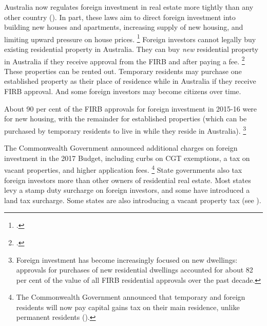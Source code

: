Australia now regulates foreign investment in real estate more tightly than any other country (). In part, these laws aim to direct foreign investment into building new houses and apartments, increasing supply of new housing, and limiting upward pressure on house prices.%
    \footcite{FIRB2017realestate}
Foreign investors cannot legally buy existing residential property in Australia. They can buy \emph{new} residential property in Australia if they receive approval from the FIRB and after paying a fee.%
    \footcite{FIRB2017residentialland}
These properties can be rented out.
Temporary residents may purchase one established property as their place of residence while in Australia if they receive FIRB approval.
And some foreign investors may become citizens over time.

About 90 per cent of the FIRB approvals for foreign investment in 2015-16 were for new housing, with the remainder for established properties (which can be purchased by temporary residents to live in while they reside in Australia).%
	\footnote{Foreign investment has become increasingly focused on new dwellings: approvals for purchases of new residential dwellings accounted for about 82 per cent of the value of all FIRB residential approvals over the past decade.}

The Commonwealth Government announced additional charges on foreign investment in the 2017 Budget, including curbs on CGT exemptions, a tax on vacant properties, and higher application fees.%
	\footnote{The Commonwealth Government announced that temporary and foreign residents will now pay capital gains tax on their main residence, unlike permanent residents (\textcite{Budget1718-Stronger-rules-foreign-investors-own-Aust-housing}).}
State governments also tax foreign investors more than other owners of residential real estate. Most states levy a stamp duty surcharge on foreign investors, and some have introduced a land tax surcharge.
Some states are also introducing a vacant property tax (see ).

